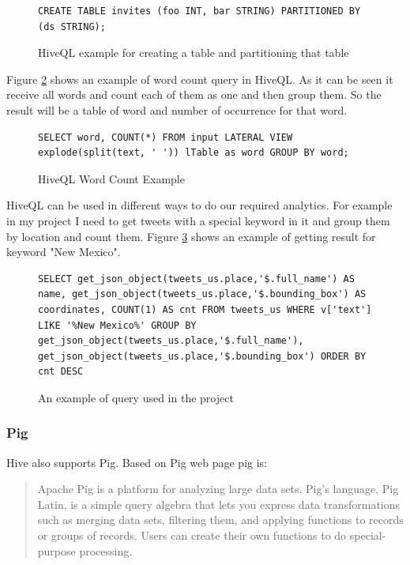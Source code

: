 \documentclass[a4paper,11pt]{report}
\begin{document}
\begin{figure}[!hbp]
\caption{HiveQL example for creating a table and partitioning that table}
\begin{lstlisting}
CREATE TABLE invites (foo INT, bar STRING) PARTITIONED BY (ds STRING);
\end{lstlisting}
\label{fig:hiveqltable}
\end{figure}

Figure \ref{fig:hiveqlwordcount} shows an example of word count query in HiveQL. As it can be seen it receive all words and count each of them as one and then group them. So the result will be a table of word and number of occurrence for that word.

\begin{figure}[!hbp]
\caption{HiveQL Word Count Example}
\begin{lstlisting}
SELECT word, COUNT(*) FROM input LATERAL VIEW explode(split(text, ' ')) lTable as word GROUP BY word;
\end{lstlisting}
\label{fig:hiveqlwordcount}
\end{figure}

HiveQL can be used in different ways to do our required analytics. For example in my project I need to get tweets with a special keyword in it and group them by location and count them. Figure \ref{fig:hiveqltweet} shows an example of getting result for keyword "New Mexico".

\begin{figure}[!hbp]
\caption{An example of query used in the project}
\begin{lstlisting}
SELECT get_json_object(tweets_us.place,'$.full_name') AS name, get_json_object(tweets_us.place,'$.bounding_box') AS coordinates, COUNT(1) AS cnt FROM tweets_us WHERE v['text'] LIKE '%New Mexico%' GROUP BY get_json_object(tweets_us.place,'$.full_name'), get_json_object(tweets_us.place,'$.bounding_box') ORDER BY cnt DESC
\end{lstlisting}
\label{fig:hiveqltweet}
\end{figure}

\subsubsection{Pig}
Hive also supports Pig. Based on Pig web page pig is:
\begin{quote}
Apache Pig is a platform for analyzing large data sets. Pig's language, Pig Latin, is a simple query algebra that lets you express data transformations such as merging data sets, filtering them, and applying functions to records or groups of records. Users can create their own functions to do special-purpose processing.
\end{quote}
\end{document}
